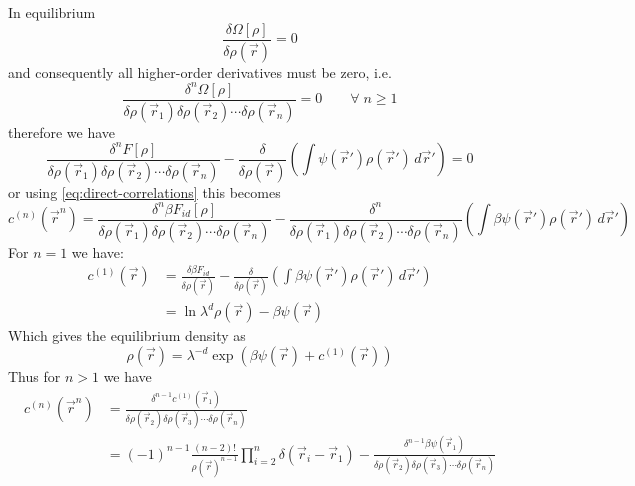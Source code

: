 \documentclass[12pt]{report}
\begin{document}
In equilibrium
\begin{equation}
  \frac{\delta \Omega[\rho]}{\delta\rho(\vec{r})} = 0
\end{equation}
and consequently all higher-order derivatives must be zero, i.e.\
\begin{equation}
  \frac{\delta^n \Omega[\rho]}{\delta\rho(\vec{r}_1) \delta\rho(\vec{r}_2) \cdots \delta\rho(\vec{r}_n)} = 0 \qquad \forall \; n \ge 1
\end{equation}
therefore we have
\begin{equation}
  \frac{\delta^n F[\rho]}{\delta \rho(\vec{r}_1) \delta \rho(\vec{r}_2) \cdots \delta \rho(\vec{r}_n)} -
  \frac{\delta}{\delta\rho(\vec{r})}
  \left(
  \int \psi(\vec{r}') \rho(\vec{r}') \, d\vec{r}'
  \right)
  = 0
\end{equation}
or using \eqref{eq:direct-correlations} this becomes
\begin{equation}
  c^{(n)}(\vec{r}^n) =
  \frac{\delta^n \beta F_{id}[\rho]}{\delta \rho(\vec{r}_1) \delta \rho(\vec{r}_2) \cdots \delta \rho(\vec{r}_n)} -
  \frac{\delta^n}{\delta \rho(\vec{r}_1) \delta \rho(\vec{r}_2) \cdots \delta \rho(\vec{r}_n)}
  \left(
  \int \beta\psi(\vec{r}') \rho(\vec{r}') \, d\vec{r}'
  \right)
\end{equation}
For $n=1$ we have:
\begin{equation}
  \begin{aligned}
    c^{(1)}(\vec{r}) &=
    \frac{\delta \beta F_{id}}{\delta \rho(\vec{r})} -
    \frac{\delta}{\delta \rho(\vec{r})}
    \left(
    \int \beta\psi(\vec{r}') \rho(\vec{r}') \, d\vec{r}'
    \right) \\
    &=
    \ln{\lambda^d \rho(\vec{r})} -
    \beta\psi(\vec{r})
  \end{aligned}
\end{equation}
Which gives the equilibrium density as
\begin{equation}
  \rho(\vec{r}) = \lambda^{-d} \exp{\left(\beta\psi(\vec{r}) + c^{(1)}(\vec{r})\right)}
\end{equation}
Thus for $n > 1$ we have
\begin{equation}
  \begin{aligned}
    c^{(n)}(\vec{r}^n) &=
    \frac{\delta^{n-1} c^{(1)}(\vec{r}_1)}{\delta \rho(\vec{r}_2) \delta \rho(\vec{r}_3) \cdots \delta \rho(\vec{r}_n)} \\
    &=
    (-1)^{n-1}
    \frac{(n-2)!}{\rho(\vec{r})^{n-1}}
    \prod_{i=2}^n \delta(\vec{r}_i - \vec{r}_1) -
    \frac{\delta^{n-1} \beta\psi(\vec{r}_1)}{\delta \rho(\vec{r}_2) \delta \rho(\vec{r}_3) \cdots \delta \rho(\vec{r}_n)}
  \end{aligned}
\end{equation}
\end{document}
